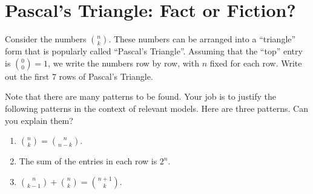 \newpage
\section{Pascal's Triangle: Fact or Fiction?}\label{A:factOrFiction}

Consider the numbers $\binom{n}{k}$.  These numbers can be arranged
into a ``triangle'' form that is popularly called ``Pascal's
Triangle''.  Assuming that the ``top'' entry is $\binom{0}{0}=1$, we
write the numbers row by row, with $n$ fixed for each row.  Write out
the first 7 rows of Pascal's Triangle.

\vspace{3in}


Note that there are many patterns to be found.  Your job is to justify
the following patterns in the context of relevant models. Here are three patterns.  Can you explain them?
\begin{enumerate}
\item $\binom{n}{k} = \binom{n}{n-k}$.
\item The sum of the entries in each row is $2^n$.
\item $\binom{n}{k-1} + \binom{n}{k} = \binom{n+1}{k}$.
\end{enumerate}

